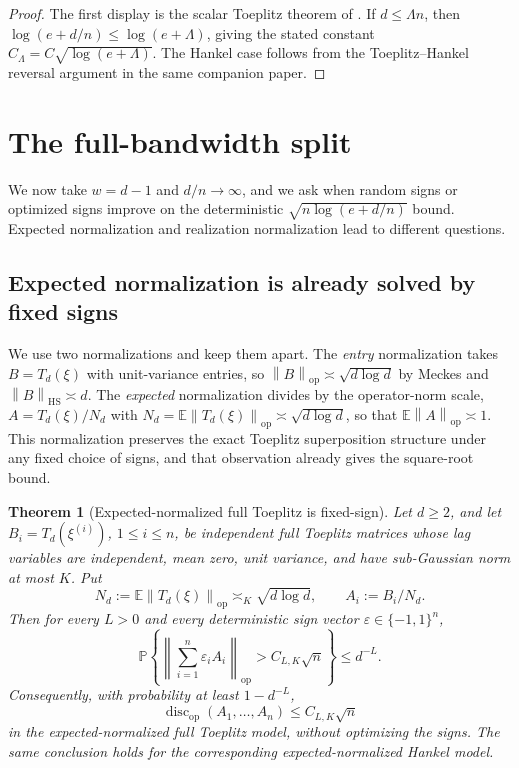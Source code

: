 \documentclass[11pt]{amsart}
\numberwithin{equation}{section}
\newtheorem{theorem}{Theorem}[section]
\theoremstyle{definition}
\theoremstyle{remark}
\newcommand{\op}{\mathrm{op}}
\newcommand{\HS}{\mathrm{HS}}
\newcommand{\discop}{\operatorname{disc}_{\op}}
\newcommand{\Prob}{\mathbb P}
\newcommand{\Exp}{\mathbb E}
\newcommand{\norm}[1]{\left\lVert #1\right\rVert}
\newcommand{\eps}{\varepsilon}
\begin{document}
\begin{proof}
The first display is the scalar Toeplitz theorem of \cite{Shmalo-paper12}.  If
\(d\le\Lambda n\), then \(\log(e+d/n)\le\log(e+\Lambda)\), giving the stated
constant \(C_\Lambda=C\sqrt{\log(e+\Lambda)}\).  The Hankel case follows from
the Toeplitz--Hankel reversal argument in the same companion paper.
\end{proof}

\section{The full-bandwidth split}\label{sec:full}

We now take $w=d-1$ and $d/n\to\infty$, and we ask when random signs or optimized
signs improve on the deterministic $\sqrt{n\log(e+d/n)}$ bound. Expected
normalization and realization normalization lead to different questions.

\subsection{Expected normalization is already solved by fixed signs}

We use two normalizations and keep them apart. The \emph{entry} normalization
takes $B=T_d(\xi)$ with unit-variance entries, so $\norm{B}_{\op}\asymp
\sqrt{d\log d}$ by Meckes \cite{Meckes} and $\norm{B}_{\HS}\asymp d$. The
\emph{expected} normalization divides by the operator-norm scale,
$A=T_d(\xi)/N_d$ with $N_d=\Exp\norm{T_d(\xi)}_{\op}\asymp\sqrt{d\log d}$, so that
$\Exp\norm{A}_{\op}\asymp1$. This normalization preserves the exact Toeplitz
superposition structure under any fixed choice of signs, and that observation
already gives the square-root bound.

\begin{theorem}[Expected-normalized full Toeplitz is fixed-sign]\label{thm:expected-full}
Let \(d\ge2\), and let \(B_i=T_d(\xi^{(i)})\), \(1\le i\le n\), be independent full Toeplitz
matrices whose lag variables are independent, mean zero, unit variance, and have
sub-Gaussian norm at most \(K\). Put
\[
  N_d:=\Exp\norm{T_d(\xi)}_{\op}\asymp_K \sqrt{d\log d},
  \qquad A_i:=B_i/N_d .
\]
Then for every \(L>0\) and every deterministic sign vector
\(\eps\in\{-1,1\}^n\),
\[
  \Prob\left\{\norm{\sum_{i=1}^n\eps_iA_i}_{\op}
  > C_{L,K}\sqrt n\right\}\le d^{-L}.
\]
Consequently, with probability at least \(1-d^{-L}\),
\[
  \discop(A_1,\ldots,A_n)\le C_{L,K}\sqrt n
\]
in the expected-normalized full Toeplitz model, without optimizing the signs.
The same conclusion holds for the corresponding expected-normalized Hankel
model.
\end{theorem}
\end{document}
